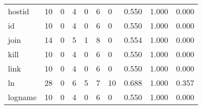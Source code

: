 \begin{longtable}{lp{1.3cm}p{1.3cm}p{1.3cm}p{1.3cm}p{1.3cm}p{1.3cm}p{1.3cm}p{1.3cm}p{1.3cm}}
hostid    &                     10 &                                             0 &                                            4 &                                           0 &                                            6 &                                          0 &                                0.550 &                                  1.000 &                                0.000 \\
id        &                     10 &                                             0 &                                            4 &                                           0 &                                            6 &                                          0 &                                0.550 &                                  1.000 &                                0.000 \\
join      &                     14 &                                             0 &                                            5 &                                           1 &                                            8 &                                          0 &                                0.554 &                                  1.000 &                                0.000 \\
kill      &                     10 &                                             0 &                                            4 &                                           0 &                                            6 &                                          0 &                                0.550 &                                  1.000 &                                0.000 \\
link      &                     10 &                                             0 &                                            4 &                                           0 &                                            6 &                                          0 &                                0.550 &                                  1.000 &                                0.000 \\
ln        &                     28 &                                             0 &                                            6 &                                           5 &                                            7 &                                         10 &                                0.688 &                                  1.000 &                                0.357 \\
logname   &                     10 &                                             0 &                                            4 &                                           0 &                                            6 &                                          0 &                                0.550 &                                  1.000 &                                0.000 \\

\end{longtable}

